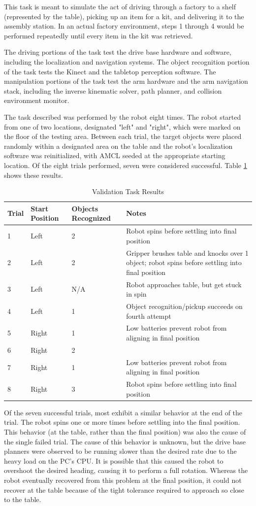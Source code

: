\documentclass[]{cwru} %
\begin{document}
This task is meant to simulate the act of driving through a factory to a
shelf (represented by the table), picking up an item for a kit, and
delivering it to the assembly station. In an actual factory environment,
steps 1 through 4 would be performed repeatedly until every item in the
kit was retrieved.

The driving portions of the task test the drive base hardware and
software, including the localization and navigation systems. The object
recognition portion of the task tests the Kinect and the tabletop
perception software. The manipulation portions of the task test the arm
hardware and the arm navigation stack, including the inverse kinematic
solver, path planner, and collision environment monitor.

The task described was performed by the robot eight times. The robot
started from one of two locations, designated "left" and "right", which
were marked on the floor of the testing area. Between each trial, the
target objects were placed randomly within a designated area on the
table and the robot's localization software was reinitialized, with AMCL
seeded at the appropriate starting location. Of the eight trials
performed, seven were considered successful. Table \ref{table:validation} shows these
results.

\begin{longtable}[c]{@{}lp{3cm}p{2.5cm}p{7.5cm}@{}}
\caption{Validation Task Results}
\label{table:validation}\tabularnewline
\endfirsthead
\toprule
\textbf{Trial} & \textbf{Start
Position} & \textbf{Objects Recognized} & \textbf{Notes}\tabularnewline
\midrule
\endhead
1 & Left & 2 & Robot spins before settling into final
position\tabularnewline
2 & Left & 2 & Gripper brushes table and knocks over 1 object; robot
spins before settling into final position\tabularnewline
3 & Left & N/A & Robot approaches table, but get stuck in
spin\tabularnewline
4 & Left & 1 & Object recognition/pickup succeeds on fourth
attempt\tabularnewline
5 & Right & 1 & Low batteries prevent robot from aligning in final
position\tabularnewline
6 & Right & 2 &\tabularnewline
7 & Right & 1 & Low batteries prevent robot from aligning in final
position\tabularnewline
8 & Right & 3 & Robot spins before settling into final
position\tabularnewline
\bottomrule
\end{longtable}

Of the seven successful trials, most exhibit a similar behavior at the
end of the trial. The robot spins one or more times before settling into
the final position. This behavior (at the table, rather than the final
position) was also the cause of the single failed trial. The cause of
this behavior is unknown, but the drive base planners were observed to
be running slower than the desired rate due to the heavy load on the
PC's CPU. It is possible that this caused the robot to overshoot the
desired heading, causing it to perform a full rotation. Whereas the
robot eventually recovered from this problem at the final position, it
could not recover at the table because of the tight tolerance required
to approach so close to the table.
\end{document}
